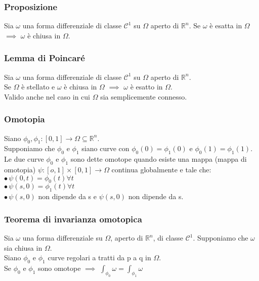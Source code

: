 \documentclass{article} %
\begin{document}
    \subsubsection*{Proposizione}
    Sia $\omega$ una forma differenziale di classe $\mathcal{C}^1$ su $\Omega$ aperto di $\mathbb{R}^n$.
    Se $\omega$ è esatta in $\Omega$ $\implies$ $\omega$ è chiusa in $\Omega$.

    \subsubsection*{Lemma di Poincaré}
    Sia $\omega$ una forma differenziale di classe $\mathcal{C}^1$ su $\Omega$ aperto di $\mathbb{R}^n$. \\
    Se $\Omega$ è stellato e $\omega$ è chiusa in $\Omega$ $\implies$ $\omega$ è esatto in $\Omega$.\\
    Valido anche nel caso in cui $\Omega$ sia semplicemente connesso.

    \subsubsection*{Omotopia}
    Siano $\phi_0, \phi_1:[0,1] \to \Omega \subseteq \mathbb{R}^n$. \\ Supponiamo che $\phi_0$ e $\phi_1$ siano curve con $\phi_0(0)=\phi_1(0)$ e $\phi_0(1)=\phi_1(1)$. \\ Le due curve $\phi_0$ e $\phi_1$ sono dette omotope quando esiste una mappa (mappa di omotopia) $\psi:[o,1] \times [0,1] \to \Omega$ continua globalmente e tale che: \\
    $\bullet \, \psi(0,t)=\phi_0(t) \forall t$ \\
    $\bullet \, \psi(s,0)=\phi_1(t) \forall t$ \\
    $\bullet \, \psi(s,0)$ non dipende da s e $\psi(s,0)$ non dipende da s.

    \subsubsection*{Teorema di invarianza omotopica}
    Sia $\omega$ una forma differenziale su $\Omega$, aperto di $\mathbb{R}^n$, di classe $\mathcal{C}^1$. Supponiamo che $\omega$ sia chiusa in $\Omega$. \\
    Siano $\phi_0$ e $\phi_1$ curve regolari a tratti da p a q in $\Omega$. \\
    Se $\phi_0$ e $\phi_1$ sono omotope $\implies$ $\int_{\phi_0} \omega = \int_{\phi_1} \omega$
\end{document}
